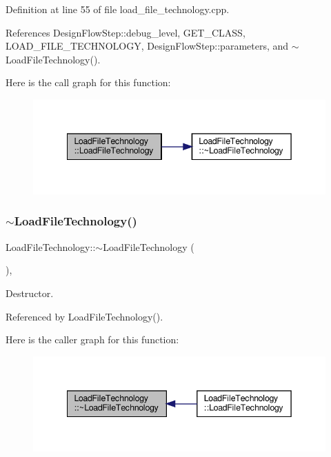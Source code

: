 Definition at line 55 of file load\+\_\+file\+\_\+technology.\+cpp.



References Design\+Flow\+Step\+::debug\+\_\+level, G\+E\+T\+\_\+\+C\+L\+A\+SS, L\+O\+A\+D\+\_\+\+F\+I\+L\+E\+\_\+\+T\+E\+C\+H\+N\+O\+L\+O\+GY, Design\+Flow\+Step\+::parameters, and $\sim$\+Load\+File\+Technology().

Here is the call graph for this function\+:
\nopagebreak
\begin{figure}[H]
\begin{center}
\leavevmode
\includegraphics[width=342pt]{dd/dc2/classLoadFileTechnology_a29819bebe9045c9f58a59983fd14beda_cgraph}
\end{center}
\end{figure}
\mbox{\label{classLoadFileTechnology_a7ab754beea7b31089c6b7a5eff8fb5c9}} 
\subsubsection{\texorpdfstring{$\sim$\+Load\+File\+Technology()}{~LoadFileTechnology()}}
{\footnotesize\ttfamily Load\+File\+Technology\+::$\sim$\+Load\+File\+Technology (\begin{DoxyParamCaption}{ }\end{DoxyParamCaption})\hspace{0.3cm}{\ttfamily [override]}, {\ttfamily [default]}}



Destructor. 



Referenced by Load\+File\+Technology().

Here is the caller graph for this function\+:
\nopagebreak
\begin{figure}[H]
\begin{center}
\leavevmode
\includegraphics[width=342pt]{dd/dc2/classLoadFileTechnology_a7ab754beea7b31089c6b7a5eff8fb5c9_icgraph}
\end{center}
\end{figure}


